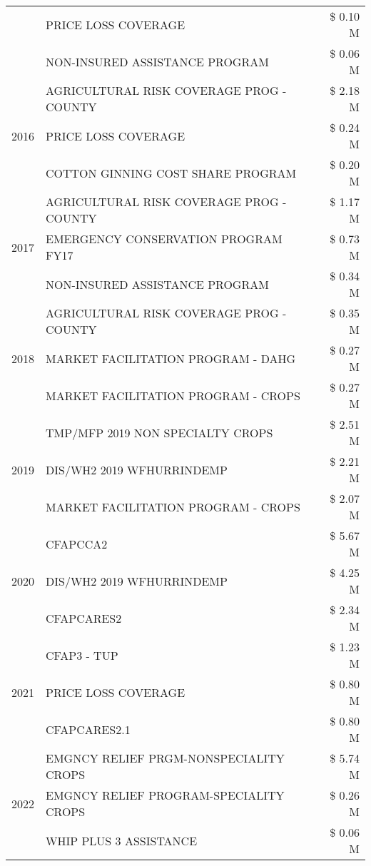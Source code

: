 \begin{tabular}{llr}
 & PRICE LOSS COVERAGE & \$ 0.10 M \\
 & NON-INSURED ASSISTANCE PROGRAM & \$ 0.06 M \\
\cline{1-3}
\multirow[t]{3}{*}{2016} & AGRICULTURAL RISK COVERAGE PROG - COUNTY & \$ 2.18 M \\
 & PRICE LOSS COVERAGE & \$ 0.24 M \\
 & COTTON GINNING COST SHARE PROGRAM & \$ 0.20 M \\
\cline{1-3}
\multirow[t]{3}{*}{2017} & AGRICULTURAL RISK COVERAGE PROG - COUNTY & \$ 1.17 M \\
 & EMERGENCY CONSERVATION PROGRAM FY17 & \$ 0.73 M \\
 & NON-INSURED ASSISTANCE PROGRAM & \$ 0.34 M \\
\cline{1-3}
\multirow[t]{3}{*}{2018} & AGRICULTURAL RISK COVERAGE PROG - COUNTY & \$ 0.35 M \\
 & MARKET FACILITATION PROGRAM - DAHG & \$ 0.27 M \\
 & MARKET FACILITATION PROGRAM - CROPS & \$ 0.27 M \\
\cline{1-3}
\multirow[t]{3}{*}{2019} & TMP/MFP 2019 NON SPECIALTY CROPS & \$ 2.51 M \\
 & DIS/WH2 2019 WFHURRINDEMP & \$ 2.21 M \\
 & MARKET FACILITATION PROGRAM - CROPS & \$ 2.07 M \\
\cline{1-3}
\multirow[t]{3}{*}{2020} & CFAPCCA2 & \$ 5.67 M \\
 & DIS/WH2 2019 WFHURRINDEMP & \$ 4.25 M \\
 & CFAPCARES2 & \$ 2.34 M \\
\cline{1-3}
\multirow[t]{3}{*}{2021} & CFAP3 - TUP & \$ 1.23 M \\
 & PRICE LOSS COVERAGE & \$ 0.80 M \\
 & CFAPCARES2.1 & \$ 0.80 M \\
\cline{1-3}
\multirow[t]{3}{*}{2022} & EMGNCY RELIEF PRGM-NONSPECIALITY CROPS & \$ 5.74 M \\
 & EMGNCY RELIEF PROGRAM-SPECIALITY CROPS & \$ 0.26 M \\
 & WHIP PLUS 3 ASSISTANCE & \$ 0.06 M \\
\cline{1-3}
\bottomrule
\end{tabular}
